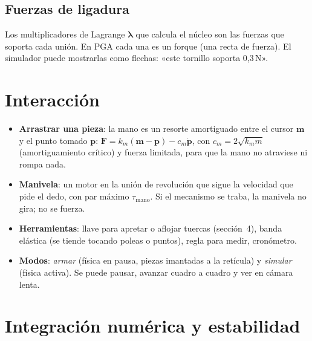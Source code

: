 \documentclass[11pt,a4paper]{article}
\numberwithin{equation}{section}
\newcommand{\vect}[1]{\bm{#1}}
\begin{document}
\subsection{Fuerzas de ligadura}
Los multiplicadores de Lagrange $\vect{\lambda}$ que calcula el núcleo son las fuerzas que soporta cada unión. En PGA
cada una es un forque (una recta de fuerza). El simulador puede mostrarlas como flechas: «este tornillo soporta
0{,}3\,N».

\section{Interacción}\label{sec:interaccion}

\begin{itemize}[leftmargin=*]
  \item \textbf{Arrastrar una pieza}: la mano es un resorte amortiguado entre el cursor $\vect{m}$ y el punto tomado
        $\vect{p}$: $\vect{F} = k_m(\vect{m} - \vect{p}) - c_m\dot{\vect{p}}$, con $c_m = 2\sqrt{k_m m}$ (amortiguamiento
        crítico) y fuerza limitada, para que la mano no atraviese ni rompa nada.
  \item \textbf{Manivela}: un motor en la unión de revolución que sigue la velocidad que pide el dedo, con par máximo
        $\tau_{\text{mano}}$. Si el mecanismo se traba, la manivela no gira; no se fuerza.
  \item \textbf{Herramientas}: llave para apretar o aflojar tuercas (sección~4), banda elástica (se tiende tocando
        poleas o puntos), regla para medir, cronómetro.
  \item \textbf{Modos}: \emph{armar} (física en pausa, piezas imantadas a la retícula) y \emph{simular} (física
        activa). Se puede pausar, avanzar cuadro a cuadro y ver en cámara lenta.
\end{itemize}

\section{Integración numérica y estabilidad}\label{sec:integracion}
\end{document}
